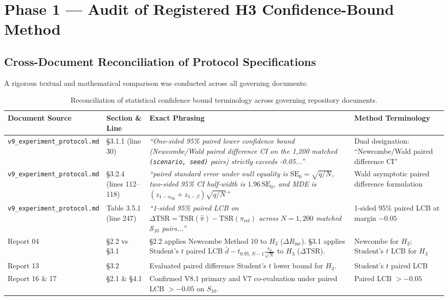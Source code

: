 \documentclass[10pt,a4paper]{article}
\begin{document}
\section{Phase 1 — Audit of Registered H3 Confidence-Bound Method}

\subsection{Cross-Document Reconciliation of Protocol Specifications}
A rigorous textual and mathematical comparison was conducted across all governing documents:

\begin{table}[h!]
\centering
\small
\begin{tabularx}{\textwidth}{l p{3.5cm} X p{3.2cm}}
\toprule
\textbf{Document Source} & \textbf{Section \& Line} & \textbf{Exact Phrasing} & \textbf{Method Terminology} \\
\midrule
\texttt{v9\_experiment\_protocol.md} & §3.1.1 (line 30) & \textit{``One-sided 95\% paired lower confidence bound (Newcombe/Wald paired difference CI on the 1,200 matched \texttt{(scenario, seed)} pairs) strictly exceeds -0.05...''} & Dual designation: ``Newcombe/Wald paired difference CI'' \\
\texttt{v9\_experiment\_protocol.md} & §3.2.4 (lines 112--118) & \textit{``paired standard error under null equality is $\mathrm{SE}_0 = \sqrt{q / N}$, two-sided 95\% CI half-width is $1.96\,\mathrm{SE}_0$, and MDE is $(z_{1-\alpha_{\mathrm{NI}}} + z_{1-\beta})\sqrt{q / N}$''} & Wald asymptotic paired difference formulation \\
\texttt{v9\_experiment\_protocol.md} & Table 3.5.1 (line 247) & \textit{``1-sided 95\% paired LCB on $\Delta\mathrm{TSR} = \mathrm{TSR}(\hat{\pi}) - \mathrm{TSR}(\pi_{\mathrm{ref}})$ across $N=1,200$ matched $\mathcal{S}_{10}$ pairs...''} & 1-sided 95\% paired LCB at margin $-0.05$ \\
Report 04 & §2.2 vs §3.1 & §2.2 applies Newcombe Method 10 to $H_2$ ($\Delta R_{\mathrm{inc}}$). §3.1 applies Student's $t$ paired LCB $\bar{d} - t_{0.95, N-1} \frac{s_d}{\sqrt{N}}$ to $H_3$ ($\Delta\mathrm{TSR}$). & Newcombe for $H_2$; Student's $t$ LCB for $H_3$ \\
Report 13 & §3.2 & Evaluated paired difference Student's $t$ lower bound for $H_3$. & Student's $t$ paired LCB \\
Report 16 \& 17 & §2.1 \& §4.1 & Confirmed V8.1 primary and V7 co-evaluation under paired LCB $> -0.05$ on $S_{10}$. & Paired LCB $> -0.05$ \\
\bottomrule
\end{tabularx}
\caption{Reconciliation of statistical confidence bound terminology across governing repository documents.}
\end{table}
\end{document}
